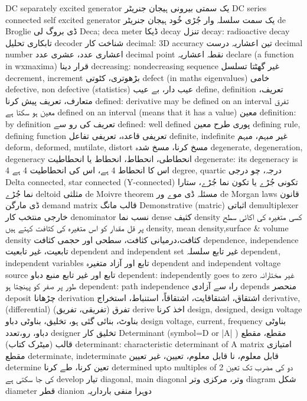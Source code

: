 DC separately excited generator	یک سمتی بیرونی ہیجان جنریٹر
DC series connected self excited generator	یک سمت سلسلہ وار جُڑی خُود ہیجان جنریٹر
de Broglie	ڈی بروگ لی
Deca; deca meter	ڈیکا
decay	تنزل
decay: radioactive decay	تابکاری تحلیل
decoder	شناخت کار
decimal: 3D accuracy	تین اعشاریہ درست
decimal number	اعشاری عدد، عشری عدد
decimal point	نقطہ اعشاریہ
declare (a function in wxmaxima)	قرار دینا
decreasing: nondecreasing sequence	غیر گھٹتا تسلسل
decrement, increment	بڑھوتری، کٹوتی
defect (in maths eigenvalues)	خامی
defective, non defective (statistics)	عیب دار، بے عیب
define, definition	تعریف، متعارف، تعریف پیش کرنا
defined: derivative may be defined on an interval	تفرق معین ہو سکتا ہے
defined on an interval (means that it has a value)	معین
definition: by definition	تعریف کی رو سے
defined: well defined	پوری طرح معین
defining rule, defining function	تعریفی قاعدہ، تعریفی تفاعل
definite, indefinite	غیر مبہم، مبہم
deform, deformed, mutilate, distort	مسخ کرنا، مسخ شدہ
degenerate, degeneration, degeneracy	انحطاطی، انحطاط، انحطاط یا انحطاطیت
degenerate: its degeneracy is 4	اس کا انحطاط 4 ہے، اس کی انحطاطیت 4 ہے
degree, quartic	درجہ، چو درجی
Delta connected, star connected (Y-connected)	تکونی جُڑے یا تکون نما جُڑے، ستارا نما جُڑے
deltoid	مثلثی
de Moivre theorem	مسئلہ ڈی موے ور
de Morgan laws	قانون ڈی مارگن
demand matrix	قالب مانگ
Demonstrative (matric)	اثباتی
demultiplexer	خارجی منتخب کار
denominator	نسب نما
dense	کثیف
density	کسی متغیرہ کی اکائی سطح پر قل مقدار کو اس متغیرہ کی کثافت کہتے ہیں
density, mean density,surface & volume density	کثافت،درمیانی کثافت، سطحی اور حجمی کثافت
dependence, independence	تابعیت، غیر تابعیت
dependent and independent set	غیر تابع سلسلہ
dependent, independent variables	تابع اور آزاد متغیرہ
dependent and independent voltage source	تابع اور غیر تابع منبع دباو
dependent: independently goes to zero	غیر مختارانہ طور پر صفر کو پہنچتا ہو
dependent: path independence	راہ سے آزادی
depends	منحصر
deposit	چڑھانا
derivation	اشتقاق، اشتقاقایت، اشتقاقاً، استنباط، استخراج
derivative, (differential)	تفرق (تفریقی، تفریق)
derive	اخذ کرنا
design, designed, design voltage	بناوٹ، بنائی گئی ہو، تخلیق، بناوٹی دباو
design voltage, current, frequency	بناوٹی دباو، رو،تعدد
designer	تخلیق کار
Determinant  (symbol=D or |A| )	مقطع، مقطع قالب (میٹرک کتاب)
determinant: characteristic determinant of A matrix	امتیازی مقطع
determinate, indeterminate	قابل معلوم، نا قابل معلوم، تعیین، غیر تعیین
determine	تعین کرنا، طے کرنا
determined upto multiples of 2	دو کی مضرب تک تعین کی جا سکتی ہے
develop	تیار
diagonal, main diagonal	وتر، مرکزی وتر
diagram	شکل
diameter	قطر
dianion	دوہرا منفی بارداریہ
